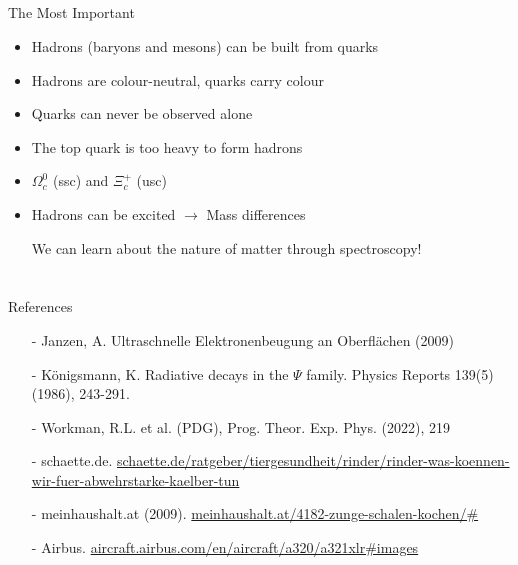 \subsection{}
\begin{frame}{The Most Important}
    \begin{itemize}
        \item Hadrons (baryons and mesons) can be built from quarks
        \item Hadrons are colour-neutral, quarks carry colour
        \item Quarks can never be observed alone
        \item The top quark is too heavy to form hadrons
        \item $\Omega_c^0$ (ssc) and $\Xi_c^+$ (usc)
        \item Hadrons can be excited $\rightarrow$ Mass differences 
        \item [\ding{43}] We can learn about the nature of matter through spectroscopy!
    \end{itemize}
 \end{frame}
\section{}
\begin{frame}{References}\footnotesize
    \begin{itemize}
    \item[-] Janzen, A. Ultraschnelle Elektronenbeugung an Oberflächen (2009)
    \item[-] Königsmann, K. Radiative decays in the $\Psi$ family. Physics Reports 139(5)(1986), 243-291.
    \item[-] Workman, R.L. et al. (PDG), Prog. Theor. Exp. Phys. (2022), 219
\item[-] schaette.de. \url{schaette.de/ratgeber/tiergesundheit/rinder/rinder-was-koennen-wir-fuer-abwehrstarke-kaelber-tun}
\item[-] meinhaushalt.at (2009). \url{meinhaushalt.at/4182-zunge-schalen-kochen/#}
\item[-] Airbus. \url{aircraft.airbus.com/en/aircraft/a320/a321xlr#images}


    \end{itemize}
\end{frame}

